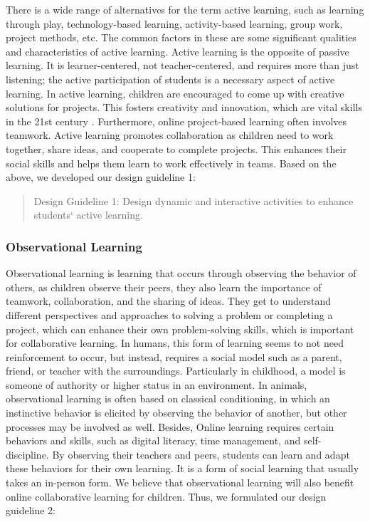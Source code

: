 There is a wide range of alternatives for the term active learning, such as learning through play, technology-based learning, activity-based learning, group work, project methods, etc. The common factors in these are some significant qualities and characteristics of active learning. Active learning is the opposite of passive learning. It is learner-centered, not teacher-centered, and requires more than just listening; the active participation of students is a necessary aspect of active learning. In active learning, children are encouraged to come up with creative solutions for projects. This fosters creativity and innovation, which are vital skills in the 21st century \citep{lamb2017key,luna2015futures}. Furthermore, online project-based learning often involves teamwork. Active learning promotes collaboration as children need to work together, share ideas, and cooperate to complete projects. This enhances their social skills and helps them learn to work effectively in teams. Based on the above, we developed our design guideline 1:
\begin{quote}
  Design Guideline 1: Design dynamic and interactive activities to enhance students‘  active learning.
\end{quote}

\subsubsection{Observational Learning}
Observational learning is learning that occurs through observing the behavior of others, as children observe their peers, they also learn the importance of teamwork, collaboration, and the sharing of ideas. They get to understand different perspectives and approaches to solving a problem or completing a project, which can enhance their own problem-solving skills, which is important for collaborative learning.  In humans, this form of learning seems to not need reinforcement to occur, but instead, requires a social model such as a parent, friend, or teacher with the surroundings. Particularly in childhood, a model is someone of authority or higher status in an environment. In animals, observational learning is often based on classical conditioning, in which an instinctive behavior is elicited by observing the behavior of another, but other processes may be involved as 
well\citep{shettleworth2009cognition}. Besides, Online learning requires certain behaviors and skills, such as digital literacy, time management, and self-discipline. By observing their teachers and peers, students can learn and adapt these behaviors for their own learning. It is a form of social learning that usually takes an in-person form. We believe that observational learning will also benefit online collaborative learning for children. Thus, we formulated our design guideline 2:

